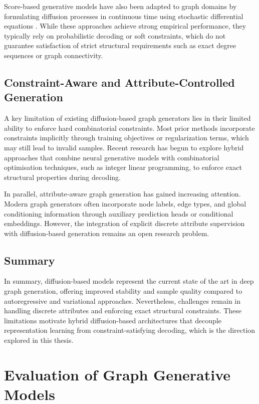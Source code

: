 Score-based generative models have also been adapted to graph domains by formulating diffusion processes in continuous time using stochastic differential equations \cite{song2021score}. While these approaches achieve strong empirical performance, they typically rely on probabilistic decoding or soft constraints, which do not guarantee satisfaction of strict structural requirements such as exact degree sequences or graph connectivity.

\subsection{Constraint-Aware and Attribute-Controlled Generation}

A key limitation of existing diffusion-based graph generators lies in their limited ability to enforce hard combinatorial constraints. Most prior methods incorporate constraints implicitly through training objectives or regularization terms, which may still lead to invalid samples. Recent research has begun to explore hybrid approaches that combine neural generative models with combinatorial optimisation techniques, such as integer linear programming, to enforce exact structural properties during decoding.

In parallel, attribute-aware graph generation has gained increasing attention. Modern graph generators often incorporate node labels, edge types, and global conditioning information through auxiliary prediction heads or conditional embeddings. However, the integration of explicit discrete attribute supervision with diffusion-based generation remains an open research problem.

\subsection{Summary}

In summary, diffusion-based models represent the current state of the art in deep graph generation, offering improved stability and sample quality compared to autoregressive and variational approaches. Nevertheless, challenges remain in handling discrete attributes and enforcing exact structural constraints. These limitations motivate hybrid diffusion-based architectures that decouple representation learning from constraint-satisfying decoding, which is the direction explored in this thesis.


\section{Evaluation of Graph Generative Models}

